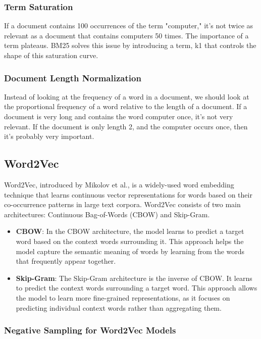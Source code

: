 \documentclass[12pt]{article}
\begin{document}
\subsubsection{Term Saturation}
If a document contains 100 occurrences of the term "computer," it's not twice as relevant as a document that contains computers 50 times. The importance of a term plateaus. BM25 solves this issue by introducing a term, k1 that controls the shape of this saturation curve.

\subsubsection{Document Length Normalization}
Instead of looking at the frequency of a word in a document, we should look at the proportional frequency of a word relative to the length of a document. If a document is very long and contains the word computer once, it's not very relevant. If the document is only length 2, and the computer occurs once, then it's probably very important. 

\subsection{Word2Vec}

Word2Vec, introduced by Mikolov et al., is a widely-used word embedding technique that learns continuous vector representations for words based on their co-occurrence patterns in large text corpora. Word2Vec consists of two main architectures: Continuous Bag-of-Words (CBOW) and Skip-Gram.

\begin{itemize}
\item \textbf{CBOW}: In the CBOW architecture, the model learns to predict a target word based on the context words surrounding it. This approach helps the model capture the semantic meaning of words by learning from the words that frequently appear together.
\item \textbf{Skip-Gram}: The Skip-Gram architecture is the inverse of CBOW. It learns to predict the context words surrounding a target word. This approach allows the model to learn more fine-grained representations, as it focuses on predicting individual context words rather than aggregating them.
\end{itemize}

\subsubsection{Negative Sampling for Word2Vec Models}
\end{document}
